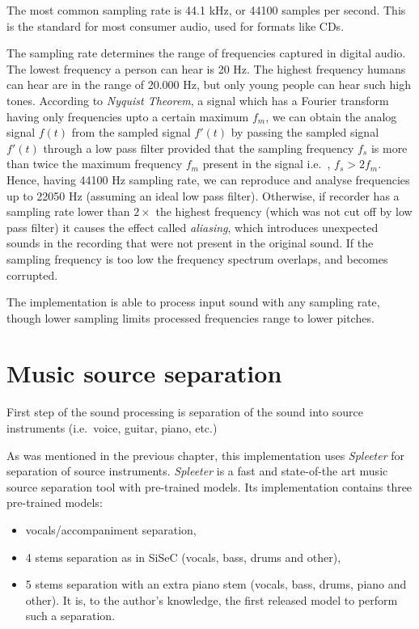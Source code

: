 The most common sampling rate is 44.1 kHz, or 44100 samples per second. This is the standard for most consumer audio,
used for formats like CDs\cite{digital-audio-basics}.

The sampling rate determines the range of frequencies captured in digital audio. The lowest frequency a person can hear
is 20 Hz. The highest frequency humans can hear are in the range of 20.000 Hz, but only young people can hear such high
tones\cite{roots-of-modern-technology}. According to \textit{Nyquist Theorem}, a signal which has a Fourier transform
having only frequencies upto a certain maximum $f_m$, we can obtain the analog signal $f(t)$ from the sampled signal
$f'(t)$ by passing the sampled signal $f'(t)$ through a low pass filter provided that the sampling frequency $f_s$ is
more than twice the maximum frequency $f_m$ present in the signal i.e.\ , $f_s > 2f_m$\cite{signals-and-systems}. Hence,
having 44100 Hz sampling rate, we can reproduce and analyse frequencies up to 22050 Hz (assuming an ideal low pass
filter). Otherwise, if recorder has a sampling rate lower than $2\times$ the highest frequency (which was not cut off
by low pass filter) it causes the effect called \textit{aliasing}, which introduces unexpected sounds in the recording
that were not present in the original sound. If the sampling frequency is too low the frequency spectrum overlaps, and
becomes corrupted\cite{signals-and-systems}.

The implementation is able to process input sound with any sampling rate, though lower sampling limits processed
frequencies range to lower pitches.

\pagebreak

\section{Music source separation}\label{sec:music-source-separation}

First step of the sound processing is separation of the sound into source instruments (i.e.\ voice, guitar, piano,
etc.)

As was mentioned in the previous chapter, this implementation uses \textit{Spleeter} for separation of source
instruments. \textit{Spleeter} is a fast and state-of-the art music source separation tool with pre-trained
models\cite{spleeter2019}. Its implementation contains three pre-trained models:

\begin{itemize}
	\item vocals/accompaniment separation,
	\item 4 stems separation as in \ac{SiSeC}\cite{stter20182018} (vocals, bass, drums and other),
	\item 5 stems separation with an extra piano stem (vocals, bass, drums, piano and other). It is, to the author's
	knowledge, the first released model to perform such a separation.
\end{itemize}

